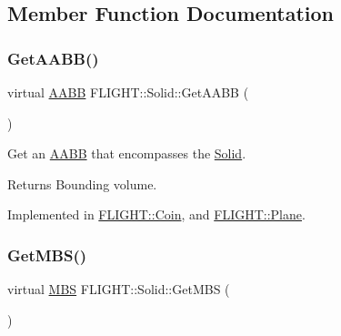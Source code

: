 \subsection{Member Function Documentation}
\mbox{\label{class_f_l_i_g_h_t_1_1_solid_ae5db89380caf480ae8f5b203dab13e5b}} 
\subsubsection{\texorpdfstring{Get\+A\+A\+B\+B()}{GetAABB()}}
{\footnotesize\ttfamily virtual \hyperlink{class_f_l_i_g_h_t_1_1_a_a_b_b}{A\+A\+BB} F\+L\+I\+G\+H\+T\+::\+Solid\+::\+Get\+A\+A\+BB (\begin{DoxyParamCaption}{ }\end{DoxyParamCaption})\hspace{0.3cm}{\ttfamily [pure virtual]}}



Get an \hyperlink{class_f_l_i_g_h_t_1_1_a_a_b_b}{A\+A\+BB} that encompasses the \hyperlink{class_f_l_i_g_h_t_1_1_solid}{Solid}. 

\begin{DoxyReturn}{Returns}
Bounding volume. 
\end{DoxyReturn}


Implemented in \hyperlink{class_f_l_i_g_h_t_1_1_coin_a89d040ae510e248428277d8afed19515}{F\+L\+I\+G\+H\+T\+::\+Coin}, and \hyperlink{class_f_l_i_g_h_t_1_1_plane_ada18a4bb3fa0cdbb4ab7a412eba92fe2}{F\+L\+I\+G\+H\+T\+::\+Plane}.

\mbox{\label{class_f_l_i_g_h_t_1_1_solid_ad96c0c336a3d32fcd4dee3c35043c862}} 
\subsubsection{\texorpdfstring{Get\+M\+B\+S()}{GetMBS()}}
{\footnotesize\ttfamily virtual \hyperlink{class_f_l_i_g_h_t_1_1_m_b_s}{M\+BS} F\+L\+I\+G\+H\+T\+::\+Solid\+::\+Get\+M\+BS (\begin{DoxyParamCaption}{ }\end{DoxyParamCaption})\hspace{0.3cm}{\ttfamily [pure virtual]}}




